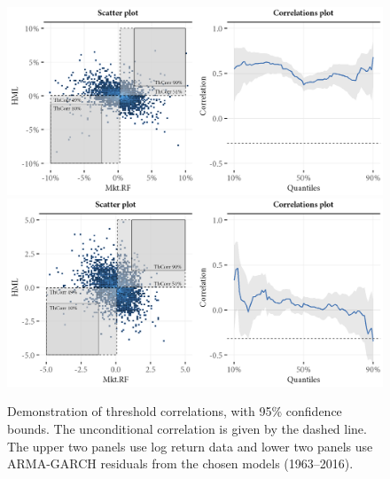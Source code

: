 \begin{figure}[!ht]
  \centering

  \includegraphics[scale=1]{graphics/threshold_explain_ret.png}
  \includegraphics[scale=1]{graphics/threshold_explain_res.png}

  \caption{Demonstration of threshold correlations, with 95\% confidence bounds. The unconditional correlation is given by the dashed line. The upper two panels use log return data and lower two panels use ARMA-GARCH residuals from the chosen models (1963--2016).}

  \label{fig:illustrate_threshold}
\end{figure}

